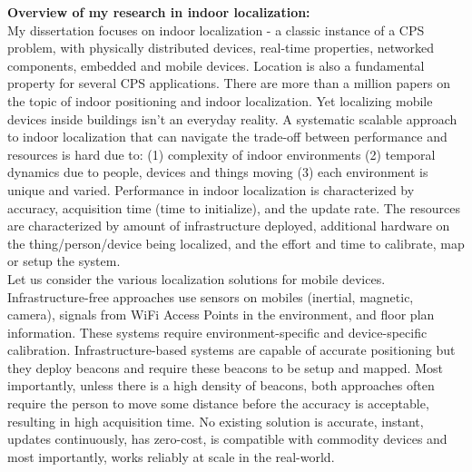 \documentclass[10pt]{article}
\begin{document}
\textbf{Overview of my research in indoor localization:}\\
My dissertation focuses on indoor localization - a classic instance of a CPS problem, with physically distributed devices, real-time properties, networked components, embedded and mobile devices. Location is also a fundamental property for several CPS applications. 
There are more than a million papers on the topic of indoor positioning and indoor localization. Yet localizing mobile devices inside buildings isn't an everyday reality. A systematic scalable approach to indoor localization that can navigate the trade-off between performance and resources is hard due to: (1) complexity of indoor environments (2) temporal dynamics due to people, devices and things moving (3) each environment is unique and varied. %
Performance in indoor localization is characterized by accuracy, acquisition time (time to initialize), and the update rate. The resources are characterized by amount of infrastructure deployed, additional hardware on the thing/person/device being localized, and the effort and time to calibrate, map or setup the system.  \\%
Let us consider the various localization solutions for mobile devices. Infrastructure-free approaches use sensors on mobiles (inertial, magnetic, camera), signals from WiFi Access Points in the environment, and floor plan information. These systems require environment-specific and device-specific calibration. Infrastructure-based systems are capable of accurate positioning but they deploy beacons and require these beacons to be setup and mapped. Most importantly, unless there is a high density of beacons, both approaches often require the person to move some distance before the accuracy is acceptable, resulting in high acquisition time. No existing solution is accurate, instant, updates continuously, has zero-cost, is compatible with commodity devices and most importantly, works reliably at scale in the real-world. \\
\end{document}
